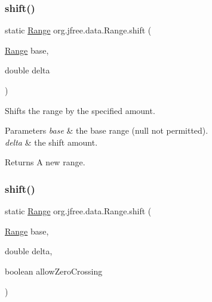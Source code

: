 \subsubsection{\texorpdfstring{shift()}{shift()}\hspace{0.1cm}{\footnotesize\ttfamily [1/2]}}
{\footnotesize\ttfamily static \mbox{\hyperlink{classorg_1_1jfree_1_1data_1_1_range}{Range}} org.\+jfree.\+data.\+Range.\+shift (\begin{DoxyParamCaption}\item[{\mbox{\hyperlink{classorg_1_1jfree_1_1data_1_1_range}{Range}}}]{base,  }\item[{double}]{delta }\end{DoxyParamCaption})\hspace{0.3cm}{\ttfamily [static]}}

Shifts the range by the specified amount.


\begin{DoxyParams}{Parameters}
{\em base} & the base range ({\ttfamily null} not permitted). \\
\hline
{\em delta} & the shift amount.\\
\hline
\end{DoxyParams}
\begin{DoxyReturn}{Returns}
A new range. 
\end{DoxyReturn}
\mbox{\label{classorg_1_1jfree_1_1data_1_1_range_a994b03849da28dbb049c218b876c9094}} 
\subsubsection{\texorpdfstring{shift()}{shift()}\hspace{0.1cm}{\footnotesize\ttfamily [2/2]}}
{\footnotesize\ttfamily static \mbox{\hyperlink{classorg_1_1jfree_1_1data_1_1_range}{Range}} org.\+jfree.\+data.\+Range.\+shift (\begin{DoxyParamCaption}\item[{\mbox{\hyperlink{classorg_1_1jfree_1_1data_1_1_range}{Range}}}]{base,  }\item[{double}]{delta,  }\item[{boolean}]{allow\+Zero\+Crossing }\end{DoxyParamCaption})\hspace{0.3cm}{\ttfamily [static]}}

